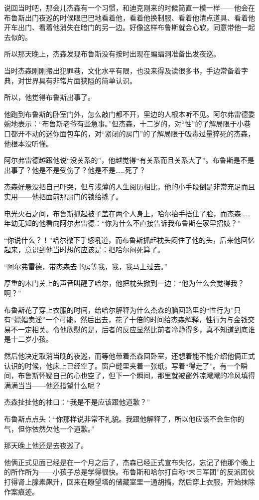 \documentclass[../main]{subfiles}
\begin{document}
说回当时吧，那会儿杰森有一个习惯，和迪克刚来的时候简直一模一样——他会在布鲁斯出门夜巡的时候眼巴巴地看着他，看着他换制服、看着他清点道具、看着他开车出门、看着他消失在暗门的另一边。好像这样布鲁斯就会心软，同意带他一起去似的。

所以那天晚上，杰森发现布鲁斯没有按时出现在蝙蝠洞准备出发夜巡。

当时杰森刚刚搬出犯罪巷，文化水平有限，也没来得及读很多书，手边常备着字典，对世界具有非常片面狭隘的简单认识。

所以，他觉得布鲁斯出事了。

他跑到布鲁斯的卧室门外，怎么敲门都不开，里边的人根本听不见。阿尔弗雷德委婉地表示：“布鲁斯老爷有些急事。”但杰森，十二岁的，对“性”的了解局限于小巷口都开不动的迷你面包车的，对“紧闭的房门”的了解局限于吸毒过量猝死的杰森，他根本没听懂。

阿尔弗雷德越跟他说“没关系的”，他越觉得“有关系而且关系大了”。布鲁斯是不是出事了？他是不是受伤了？他是不是……死了？

杰森好悬没把自己吓哭，但与浅薄的人生阅历相比，他的小手段倒是非常充足而且实用——他把面前那扇门的锁给撬了。

电光火石之间，布鲁斯抓起被子盖在两个人身上，哈尔抬手捂住了脸，而杰森……年幼无知的他看向阿尔弗雷德：“你为什么不直接告诉我布鲁斯在家里招妓？”

“你说什么？！”哈尔撤下手怒吼道，而布鲁斯抓起枕头闷住了他的头，后来他回忆起来，意识到他当时想的应该是：把哈尔闷死算了。

“阿尔弗雷德，带杰森去书房等我，我，我马上过去。”

厚重的木门关上的声音叫醒了哈尔，他把枕头掀到一边：“他为什么会觉得我？啊？”

布鲁斯花了穿上衣服的时间，给哈尔解释为什么杰森的脑回路里的“性行为”只有“嫖娼卖淫”一个可能，然后出去，花了十倍的时间给杰森解释，性行为与金钱交易不一定相关。令他欣慰的是，后者的反应显然比前者冷静得多，真不知道到底谁是十二岁小孩。

然后他决定取消当晚的夜巡，而等他带着杰森回卧室，还想着能不能介绍他俩正式认识的时候，他床上已经空了。窗户缝里夹着一张纸，写着“得走了”。有一个瞬间，布鲁斯怀疑自己的心也空了，但下一个瞬间，那里就被窗外凉飕飕的冷风填得满满当当——他还指望什么呢？

杰森扯扯他的袖口：“我是不是应该跟他道歉？”

布鲁斯点点头：“你那样说非常不礼貌。我跟他解释了，所以他应该不会生你的气，但你依然欠他一个道歉。”

那天晚上他还是去夜巡了。

他俩正式见面已经是在一个月之后了，杰森已经正式宣布失忆，忘记了他那个晚上的所作所为——小孩子总是学得很快。布鲁斯和哈尔打自称“末日军团”的反派团伙打得肾上腺素飙升，回来在瞭望塔的储藏室里一通胡搞，然后穿上衣服，开始抹除作案痕迹。
\end{document}
